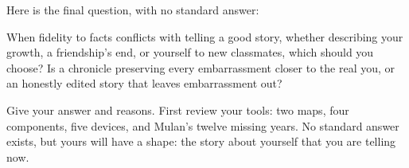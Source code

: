 Here is the final question, with no standard answer:

When fidelity to facts conflicts with telling a good story, whether describing your growth, a friendship's end, or yourself to new classmates, which should you choose? Is a chronicle preserving every embarrassment closer to the real you, or an honestly edited story that leaves embarrassment out?

Give your answer and reasons. First review your tools: two maps, four components, five devices, and Mulan's twelve missing years. No standard answer exists, but yours will have a shape: the story about yourself that you are telling now.
